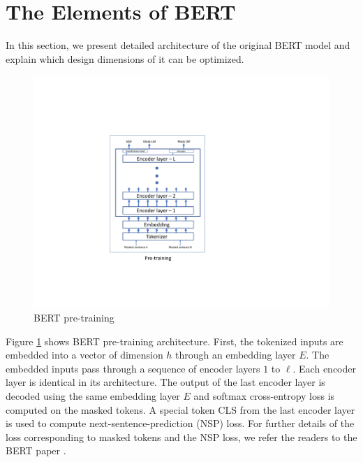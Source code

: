\documentclass[11pt,a4paper]{article}
\begin{document}


\section{The Elements of BERT}
In this section, we present detailed architecture of the original BERT model and explain which design dimensions of it can be optimized. 
\begin{figure}[h]
\centering
\includegraphics[scale=0.3]{bert_architecture2}
\caption{BERT pre-training}
\label{fig:bert1}
\end{figure}
Figure \ref{fig:bert1} shows BERT pre-training architecture. First, the tokenized inputs are embedded into a vector of dimension $h$ through an embedding layer $E$. The embedded inputs pass through a sequence of encoder layers $1$ to $\ell$. Each encoder layer is identical in its architecture. The output of the last encoder layer is decoded using the same embedding layer $E$ and softmax cross-entropy loss is computed on the masked tokens. A special token CLS from the last encoder layer is used to compute next-sentence-prediction (NSP) loss. For further details of the loss corresponding to masked tokens and the NSP loss, we refer the readers to the BERT paper \citep{devlin2018bert}. 
\end{document}
